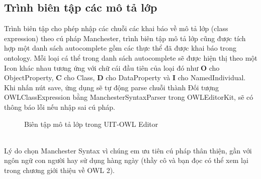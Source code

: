 \subsection{Trình biên tập các mô tả lớp}
Trình biên tập cho phép nhập các chuỗi các khai báo về mô tả lớp (class expression) theo cú pháp Manchester, trình biên tập mô tả lớp cũng được tích hợp một danh sách autocomplete gồm các thực thể đã được khai báo trong ontology. Mỗi loại cá thể trong danh sách autocomplete sẽ được hiện thị theo một Icon khác nhau tương ứng với chữ cái đầu tiên của loại đó như \textbf{O} cho ObjectProperty, \textbf{C} cho Class, \textbf{D} cho DataProperty và \textbf{I} cho NamedIndividual. Khi nhấn nút save, ứng dụng sẽ tự động parse chuỗi thành Đối tượng OWLClassExpression bằng ManchesterSyntaxParser trong OWLEditorKit, sẽ có thông báo lỗi nếu nhập sai cú pháp.
\begin{figure}[h!]
	\centering
	\caption{Biên tập mô tả lớp trong UIT-OWL Editor\label{overflow}}
\end{figure}
\\
Lý do chọn Manchester Syntax vì chúng em ưu tiên cú pháp thân thiện, gần với ngôn ngữ con người hay sử dụng hàng ngày (thầy cô và bạn đọc có thể xem lại trong chương giới thiệu về OWL 2).
